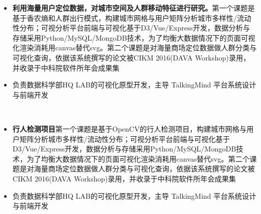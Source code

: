 \documentclass{resume}
\begin{document}
\begin{itemize}
  \item \textbf{利用海量用户定位数据，对城市空间及人群移动特征进行研究。}第一个课题是基于香农熵和人群出行模式，构建城市网格与用户矩阵分析城市多样性/流动性分布；可视分析平台前端与可视化基于D3/Vue/Express开发，数据分析与存储采用Python/MySQL/MongoDB技术，为了均衡大数据情况下的页面可视化渲染消耗用canvas替代svg。第二个课题是对海量商场定位数据做人群分类与可视化查询，依据该系统撰写的论文被CIKM 2016(DAVA Workshop)录用，并收录于中科院软件所年会成果集
  \item 负责数据科学部HQ LAB的可视化原型开发，主导 TalkingMind 平台系统设计与前端开发
\end{itemize}
\
\begin{itemize}
  \item \textbf{行人检测项目}第一个课题是基于OpenCV的行人检测项目，构建城市网格与用户矩阵分析城市多样性/流动性分布；可视分析平台前端与可视化基于D3/Vue/Express开发，数据分析与存储采用Python/MySQL/MongoDB技术，为了均衡大数据情况下的页面可视化渲染消耗用canvas替代svg。第二个课题是对海量商场定位数据做人群分类与可视化查询，依据该系统撰写的论文被CIKM 2016(DAVA Workshop)录用，并收录于中科院软件所年会成果集
  \item 负责数据科学部HQ LAB的可视化原型开发，主导 TalkingMind 平台系统设计与前端开发
\end{itemize}


\end{document}
